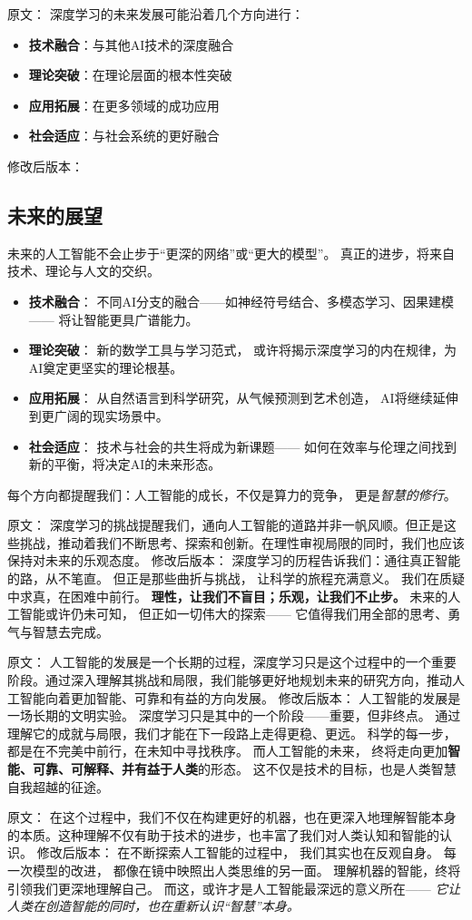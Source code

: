 原文：
深度学习的未来发展可能沿着几个方向进行：
\begin{itemize}
\item \textbf{技术融合}：与其他AI技术的深度融合
\item \textbf{理论突破}：在理论层面的根本性突破
\item \textbf{应用拓展}：在更多领域的成功应用
\item \textbf{社会适应}：与社会系统的更好融合
\end{itemize}
修改后版本：
\subsection{未来的展望}  
未来的人工智能不会止步于“更深的网络”或“更大的模型”。  
真正的进步，将来自技术、理论与人文的交织。  
\begin{itemize}
\item \textbf{技术融合}：  
  不同AI分支的融合——如神经符号结合、多模态学习、因果建模——  
  将让智能更具广谱能力。  
\item \textbf{理论突破}：  
  新的数学工具与学习范式，  
  或许将揭示深度学习的内在规律，为AI奠定更坚实的理论根基。  
\item \textbf{应用拓展}：  
  从自然语言到科学研究，从气候预测到艺术创造，  
  AI将继续延伸到更广阔的现实场景中。  
\item \textbf{社会适应}：  
  技术与社会的共生将成为新课题——  
  如何在效率与伦理之间找到新的平衡，将决定AI的未来形态。  
\end{itemize}
每个方向都提醒我们：人工智能的成长，不仅是算力的竞争，  
更是\textit{智慧的修行}。



原文：
深度学习的挑战提醒我们，通向人工智能的道路并非一帆风顺。但正是这些挑战，推动着我们不断思考、探索和创新。在理性审视局限的同时，我们也应该保持对未来的乐观态度。
修改后版本：
深度学习的历程告诉我们：通往真正智能的路，从不笔直。  
但正是那些曲折与挑战，  
让科学的旅程充满意义。  
我们在质疑中求真，在困难中前行。  
\textbf{理性，让我们不盲目；乐观，让我们不止步。}  
未来的人工智能或许仍未可知，  
但正如一切伟大的探索——  
它值得我们用全部的思考、勇气与智慧去完成。



原文：
人工智能的发展是一个长期的过程，深度学习只是这个过程中的一个重要阶段。通过深入理解其挑战和局限，我们能够更好地规划未来的研究方向，推动人工智能向着更加智能、可靠和有益的方向发展。
修改后版本：
人工智能的发展是一场长期的文明实验。  
深度学习只是其中的一个阶段——重要，但非终点。  
通过理解它的成就与局限，我们才能在下一段路上走得更稳、更远。  
科学的每一步，都是在不完美中前行，在未知中寻找秩序。  
而人工智能的未来，  
终将走向更加\textbf{智能、可靠、可解释、并有益于人类}的形态。  
这不仅是技术的目标，也是人类智慧自我超越的征途。



原文：
在这个过程中，我们不仅在构建更好的机器，也在更深入地理解智能本身的本质。这种理解不仅有助于技术的进步，也丰富了我们对人类认知和智能的认识。
修改后版本：
在不断探索人工智能的过程中，  
我们其实也在反观自身。  
每一次模型的改进，  
都像在镜中映照出人类思维的另一面。  
理解机器的智能，终将引领我们更深地理解自己。  
而这，或许才是人工智能最深远的意义所在——  
\textit{它让人类在创造智能的同时，也在重新认识“智慧”本身。}


